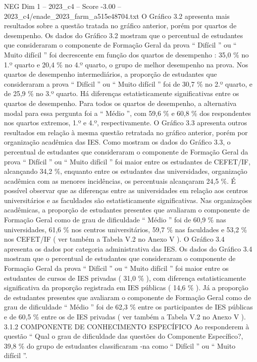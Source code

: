 \begin{textsample}{NEG Dim 1 – 2023\_c4 – Score -3.00 – 2023\_c4/enade\_2023\_farm\_a515e48704.txt}
O Gráfico 3.2 apresenta mais resultados sobre a questão tratada no gráfico anterior, porém por quartos de desempenho.
Os dados do Gráfico 3.2 mostram que o percentual de estudantes que consideraram o componente de Formação Geral da prova “ Difícil ” ou “ Muito difícil ” foi decrescente em função dos quartos de desempenho : 35,0 \% no 1.º quarto e 20,4 \% no 4.º quarto, o grupo de melhor desempenho na prova.
Nos quartos de desempenho intermediários, a proporção de estudantes que consideraram a prova “ Difícil ” ou “ Muito difícil ” foi de 30,7 \% no 2.º quarto, e de 25,9 \% no 3.º quarto.
Há diferenças estatisticamente significativas entre os quartos de desempenho.
Para todos os quartos de desempenho, a alternativa modal para essa pergunta foi a “ Médio ”, com 59,6 \% e 60,8 \% dos respondentes nos quartos extremos, 1.º e 4.º, respectivamente.
O Gráfico 3.3 apresenta outros resultados em relação à mesma questão retratada no gráfico anterior, porém por organização acadêmica das IES.
Como mostram os dados do Gráfico 3.3, o percentual de estudantes que consideraram o componente de Formação Geral da prova “ Difícil ” ou “ Muito difícil ” foi maior entre os estudantes de CEFET/IF, alcançando 34,2 \%, enquanto entre os estudantes das universidades, organização acadêmica com as menores incidências, os percentuais alcançaram 24,5 \%.
É possível observar que as diferenças entre as universidades em relação aos centros universitários e as faculdades são estatisticamente significativas.
Nas organizações acadêmicas, a proporção de estudantes presentes que avaliaram o componente de Formação Geral como de grau de dificuldade “ Médio ” foi de 60,9 \% nas universidades, 61,6 \% nos centros universitários, 59,7 \% nas faculdades e 53,2 \% nos CEFET/IF ( ver também a Tabela V.2 no Anexo V ).
O Gráfico 3.4 apresenta os dados por categoria administrativa das IES.
Os dados do Gráfico 3.4 mostram que o percentual de estudantes que consideraram o componente de Formação Geral da prova “ Difícil ” ou “ Muito difícil ” foi maior entre os estudantes de cursos de IES privadas ( 31,0 \% ), com diferença estatisticamente significativa da proporção registrada em IES públicas ( 14,6 \% ).
Já a proporção de estudantes presentes que avaliaram o componente de Formação Geral como de grau de dificuldade “ Médio ” foi de 62,3 \% entre os participantes de IES públicas e de 60,5 \% entre os de IES privadas ( ver também a Tabela V.2 no Anexo V ). 3.1.2 COMPONENTE DE CONHECIMENTO ESPECÍFICO Ao responderem à questão “ Qual o grau de dificuldade das questões do Componente Específico?, 39,8 \% do grupo de estudantes classificaram -na como “ Difícil ” ou “ Muito difícil ”.

\end{textsample}
